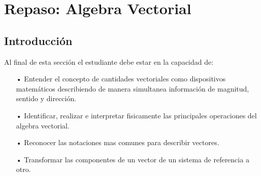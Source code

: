 \chapter{Repaso: Algebra Vectorial}
\section{Introducción}


Al final de esta sección el estudiante debe estar en la capacidad de:
%
\begin{itemize}
\item[•] Entender el concepto de cantidades vectoriales como dispositivos matemáticos describiendo de manera simultanea información de magnitud, sentido y dirección.
\item[•] Identificar, realizar e interpretar fisicamente las principales operaciones del algebra vectorial.
\item[•] Reconocer las notaciones mas comunes para describir vectores.
\item[•] Transformar las componentes de un vector de un sistema de referencia a otro.
\end{itemize}
%
